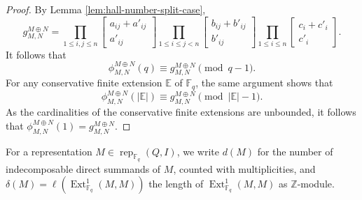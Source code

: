 \documentclass[12pt]{amsart}
\theoremstyle{remark}
\theoremstyle{definition}
\numberwithin{equation}{section}
\newcommand{\Ext}{\operatorname{Ext}\nolimits}
\newcommand{\sqbinom}[2]{\begin{bmatrix} #1 \\ #2 \end{bmatrix}}
\begin{document}
\begin{proof}
By Lemma \ref{lem:hall-number-split-case},
\[
g_{M,N}^{M\oplus N}=\prod_{1\le i,j\le n}\sqbinom{a_{ij}+a'_{ij}}{a'_{ij}}
\prod_{1\le i\le j<n}\sqbinom{b_{ij}+b'_{ij}}{b'_{ij}}
\prod_{1\le i\le n}\sqbinom{c_i+c'_i}{c'_i}.
\]
It follows that  \[\phi_{M,N}^{M\oplus N}(q)\equiv g_{M,N}^{M\oplus N} \pmod{q-1}.\]
For any conservative finite extension $\mathbb{E}$ of $\mathbb{F}_q$, the same argument shows that
\[\phi_{M,N}^{M\oplus N}(|\mathbb{E}|)\equiv g_{M,N}^{M\oplus N} \pmod{|\mathbb{E}|-1}.
\]
As the cardinalities of the conservative finite extensions are unbounded, it follows that $\phi_{M,N}^{M\oplus N}(1)=g_{M,N}^{M\oplus N}$.


\end{proof}


For a representation $M\in \operatorname{rep}_{\mathbb{F}_q}(Q,I)$, we write $d(M)$ for the number of indecomposable direct summands of $M$, counted with multiplicities, and $\delta(M)=\ell(\Ext^1_{\mathbb{F}_q}(M,M))$ the length of $\Ext^1_{\mathbb{F}_q}(M,M)$ as $\mathbb{Z}$-module.
\end{document}
